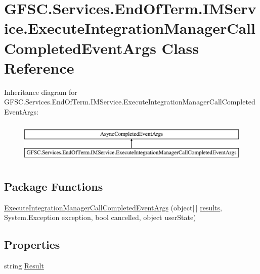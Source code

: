 \hypertarget{class_g_f_s_c_1_1_services_1_1_end_of_term_1_1_i_m_service_1_1_execute_integration_manager_call_completed_event_args}{}\section{G\+F\+S\+C.\+Services.\+End\+Of\+Term.\+I\+M\+Service.\+Execute\+Integration\+Manager\+Call\+Completed\+Event\+Args Class Reference}
\label{class_g_f_s_c_1_1_services_1_1_end_of_term_1_1_i_m_service_1_1_execute_integration_manager_call_completed_event_args}


 


Inheritance diagram for G\+F\+S\+C.\+Services.\+End\+Of\+Term.\+I\+M\+Service.\+Execute\+Integration\+Manager\+Call\+Completed\+Event\+Args\+:\begin{figure}[H]
\begin{center}
\leavevmode
\includegraphics[height=2.000000cm]{class_g_f_s_c_1_1_services_1_1_end_of_term_1_1_i_m_service_1_1_execute_integration_manager_call_completed_event_args}
\end{center}
\end{figure}
\subsection*{Package Functions}
\begin{DoxyCompactItemize}
\item 
\mbox{\hyperlink{class_g_f_s_c_1_1_services_1_1_end_of_term_1_1_i_m_service_1_1_execute_integration_manager_call_completed_event_args_a0710ba5907986e169a8ad78272891fa7}{Execute\+Integration\+Manager\+Call\+Completed\+Event\+Args}} (object\mbox{[}$\,$\mbox{]} \mbox{\hyperlink{class_g_f_s_c_1_1_services_1_1_end_of_term_1_1_i_m_service_1_1_execute_integration_manager_call_completed_event_args_a910eb890837feaf8d18ff4a8e071ded8}{results}}, System.\+Exception exception, bool cancelled, object user\+State)
\end{DoxyCompactItemize}
\subsection*{Properties}
\begin{DoxyCompactItemize}
\item 
string \mbox{\hyperlink{class_g_f_s_c_1_1_services_1_1_end_of_term_1_1_i_m_service_1_1_execute_integration_manager_call_completed_event_args_af993cb2852ca651afa704e1e6573b6b4}{Result}}
\end{DoxyCompactItemize}
